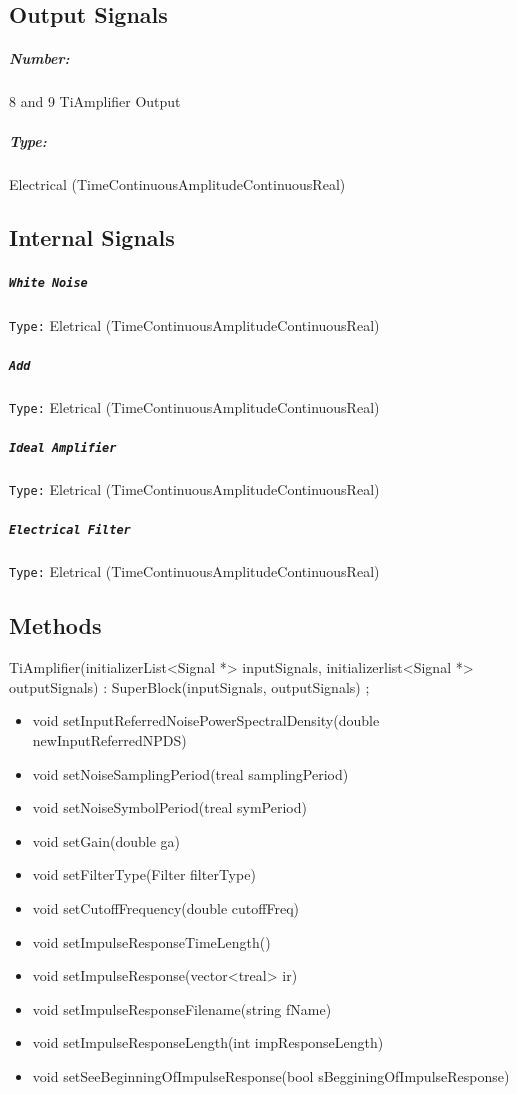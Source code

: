 \subsection*{Output Signals}
\subparagraph*{Number:} 8 and 9 Ti\textunderscore Amplifier Output
\subparagraph*{Type:} Electrical (TimeContinuousAmplitudeContinuousReal)
\subsection*{Internal Signals}
\subparagraph*{\texttt{White Noise}} 
\texttt{Type:} Eletrical (TimeContinuousAmplitudeContinuousReal)
\subparagraph*{\texttt{Add}} 
\texttt{Type:} Eletrical (TimeContinuousAmplitudeContinuousReal)
\subparagraph*{\texttt{Ideal Amplifier}} 
\texttt{Type:} Eletrical (TimeContinuousAmplitudeContinuousReal)
\subparagraph*{\texttt{Electrical Filter}} 
\texttt{Type:} Eletrical (TimeContinuousAmplitudeContinuousReal)

\subsection*{Methods}
TiAmplifier(initializer\textunderscore List<Signal *> inputSignals, initializer\textunderscore list<Signal *> outputSignals) : SuperBlock(inputSignals, outputSignals) {};
\bigbreak
\begin{itemize}
    \item void setInputReferredNoisePowerSpectralDensity(double newInputReferredNPDS)
    \item void setNoiseSamplingPeriod(t\textunderscore real samplingPeriod)
    \item void setNoiseSymbolPeriod(t\textunderscore real symPeriod)
    \item void setGain(double ga)
    \item void setFilterType(Filter filterType)
    \item void setCutoffFrequency(double cutoffFreq)
    \item void setImpulseResponseTimeLength()
    \item void setImpulseResponse(vector<t\textunderscore real> ir)
    \item void setImpulseResponseFilename(string fName)
    \item void setImpulseResponseLength(int impResponseLength)
    \item void setSeeBeginningOfImpulseResponse(bool sBegginingOfImpulseResponse)
\end{itemize}


